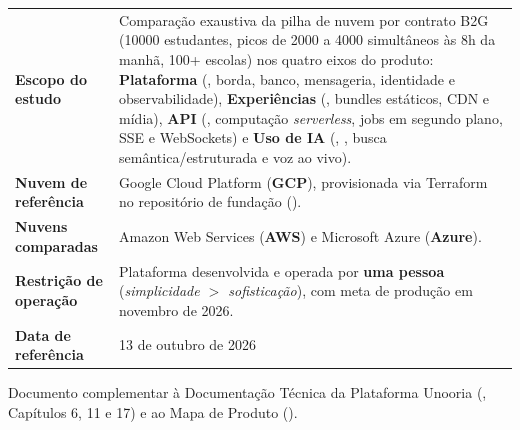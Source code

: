 \documentclass[11pt, a4paper, oneside, openany]{report}
\begin{document}
\begin{titlepage}
\begin{tcolorbox}[
  enhanced, colback=unooSurface, colframe=unooGrid,
  boxrule=0.5pt, arc=2pt, left=10pt, right=10pt, top=8pt, bottom=8pt
]
\footnotesize\renewcommand{\arraystretch}{1.35}
\begin{tabularx}{\linewidth}{@{}L{40mm}X@{}}
  \textbf{\sffamily\color{unooNavy}Escopo do estudo} &
    Comparação exaustiva da pilha de nuvem por contrato B2G (\num{10000}
    estudantes, picos de \num{2000} a \num{4000} simultâneos às 8h da manhã,
    100+ escolas) nos quatro eixos do produto: \textbf{Plataforma} (,
    borda, banco, mensageria, identidade e observabilidade),
    \textbf{Experiências} (, bundles estáticos, CDN e
    mídia), \textbf{API} (, computação \emph{serverless}, jobs em
    segundo plano, SSE e WebSockets) e \textbf{Uso de IA} (,
    , busca semântica/estruturada e voz ao vivo).\\
  \textbf{\sffamily\color{unooNavy}Nuvem de referência} &
    Google Cloud Platform (\textbf{GCP}), provisionada via Terraform no
    repositório de fundação ().\\
  \textbf{\sffamily\color{unooNavy}Nuvens comparadas} &
    Amazon Web Services (\textbf{AWS}) e Microsoft Azure (\textbf{Azure}).\\
  \textbf{\sffamily\color{unooNavy}Restrição de operação} &
    Plataforma desenvolvida e operada por \textbf{uma pessoa} (\emph{simplicidade
    $>$ sofisticação}), com meta de produção em novembro de 2026.\\
  \textbf{\sffamily\color{unooNavy}Data de referência} &
    13 de outubro de 2026\\
\end{tabularx}
\end{tcolorbox}

\vfill
\begin{flushleft}
  \footnotesize\sffamily\color{unooMuted}
  Documento complementar à Documentação Técnica da Plataforma Unooria
  (, Capítulos 6, 11 e 17) e ao Mapa de Produto
  ().
\end{flushleft}
\vspace*{10mm}
\end{titlepage}

\tableofcontents
\cleardoublepage
{}









\appendix

\end{document}
